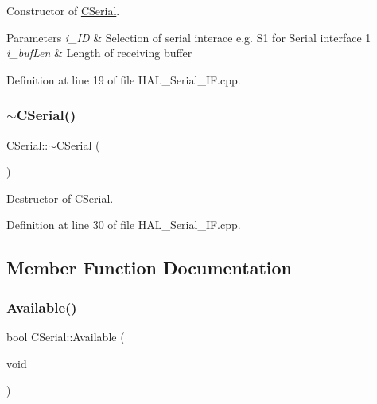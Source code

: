 Constructor of \mbox{\hyperlink{class_c_serial}{C\+Serial}}. 


\begin{DoxyParams}{Parameters}
{\em i\+\_\+\+ID} & Selection of serial interace e.\+g. S1 for Serial interface 1 \\
\hline
{\em i\+\_\+buf\+Len} & Length of receiving buffer \\
\hline
\end{DoxyParams}


Definition at line 19 of file H\+A\+L\+\_\+\+Serial\+\_\+\+I\+F.\+cpp.

\mbox{\label{class_c_serial_aff5444dd7e6a9ddc43cbce0e959edf7a}} 
\subsubsection{\texorpdfstring{$\sim$CSerial()}{~CSerial()}}
{\footnotesize\ttfamily C\+Serial\+::$\sim$\+C\+Serial (\begin{DoxyParamCaption}{ }\end{DoxyParamCaption})}



Destructor of \mbox{\hyperlink{class_c_serial}{C\+Serial}}. 



Definition at line 30 of file H\+A\+L\+\_\+\+Serial\+\_\+\+I\+F.\+cpp.



\subsection{Member Function Documentation}
\mbox{\label{class_c_serial_abb43734223d937a86e7616636ea16024}} 
\subsubsection{\texorpdfstring{Available()}{Available()}}
{\footnotesize\ttfamily bool C\+Serial\+::\+Available (\begin{DoxyParamCaption}\item[{void}]{ }\end{DoxyParamCaption})}



